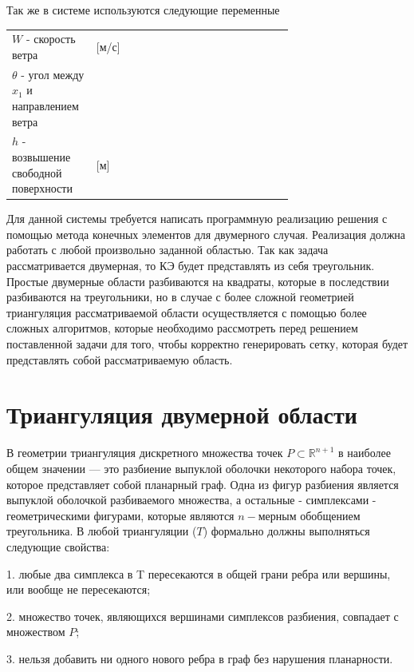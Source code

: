 \documentclass[14pt]{extreport}
\begin{document}
Так же в системе используются следующие переменные

\begin{threeparttable}
\begin{longtable}[H]{lp{0.7\linewidth}}
{$W$} - скорость ветра & [м/с] \\
{$\theta$} - угол между $x_1$ и направлением ветра & \\
{$h$} - возвышение свободной поверхности & [м]
\end{longtable} 
\end{threeparttable}


Для данной системы требуется написать программную реализацию решения с помощью метода конечных элементов для двумерного случая. Реализация должна работать с любой произвольно заданной областью. Так как задача рассматривается двумерная, то КЭ будет представлять из себя треугольник. Простые двумерные области разбиваются на квадраты, которые в последствии разбиваются на треугольники, но в случае с более сложной геометрией триангуляция рассматриваемой области осуществляется с помощью более сложных алгоритмов, которые необходимо рассмотреть перед решением поставленной задачи для того, чтобы корректно генерировать сетку, которая будет представлять собой рассматриваемую область.

\chapter{Триангуляция двумерной области}

В геометрии триангуляция дискретного множества точек $P\subset {\mathbb  {R}}^{{n+1}}$ в наиболее общем значении — это разбиение  выпуклой оболочки некоторого набора точек, которое представляет собой планарный граф. Одна из фигур разбиения является выпуклой оболочкой разбиваемого множества, а остальные - симплексами -  геометрическими фигурами, которые являются $n-$мерным обобщением треугольника. В любой триангуляции ($T$) формально должны выполняться следующие свойства:

	1. любые два симплекса в T пересекаются в общей грани ребра или вершины, или вообще не пересекаются;

	2. множество точек, являющихся вершинами симплексов разбиения, совпадает с множеством $P$;
	
	3. нельзя добавить ни одного нового ребра в граф без нарушения планарности.
\end{document}
